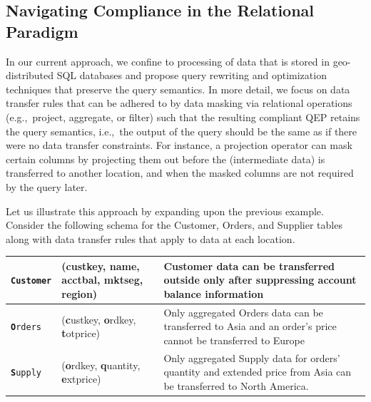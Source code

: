 \documentclass[11pt]{article}
\begin{document}
\subsection{Navigating Compliance in the Relational Paradigm} %
\label{sub:current_approach}

In our current approach, we confine to processing of data
that is stored in geo-distributed SQL databases and propose
query rewriting and optimization techniques that preserve
the query semantics. In more detail, we focus on data
transfer rules that can be adhered to by data masking via
relational operations (e.g.,~project, aggregate, or filter)
such that the resulting compliant QEP retains the query
semantics, i.e.,~the output of the query should be the same
as if there were no data transfer constraints. For instance,
a projection operator can mask certain columns by projecting
them out before the (intermediate data) is transferred to
another location, and when the masked columns are not
required by the query later.

Let us illustrate this approach by expanding upon the
previous example. Consider the following schema for the
Customer, Orders, and Supplier tables along with data
transfer rules that apply to data at each
location.\\[-1.5em]

\begin{center}
\begin{tabular}{llp{}}
\toprule
\texttt{\textbf{C}ustomer} & (\textbf{c}ustkey, \textbf{n}ame, \textbf{a}cctbal, \textbf{m}ktseg, \textbf{r}egion) & Customer data can be transferred outside
    only after suppressing account balance information \\
\midrule
\texttt{\textbf{O}rders}   & (\textbf{c}ustkey, \textbf{o}rdkey, \textbf{t}otprice) & Only aggregated Orders data can be
    transferred to Asia and an order's price cannot be transferred
    to Europe \\
\midrule
\texttt{\textbf{S}upply}   & (\textbf{o}rdkey, \textbf{q}uantity, \textbf{e}xtprice) & Only aggregated Supply data for orders'
    quantity and extended price from Asia can be transferred to
    North America.\\
\bottomrule
\end{tabular} 
\end{center}
\end{document}
